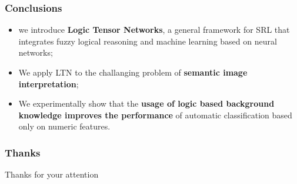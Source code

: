 \documentclass[xcolor=pdftex,dvipsnames,table]{beamer}
\begin{document}
\begin{frame}
  \frametitle{Conclusions}
  \begin{itemize}
  \item we introduce \textbf{Logic Tensor Networks},
    a general framework for SRL that integrates
      fuzzy logical reasoning and machine learning based on neural networks;
    \item We apply LTN to the challanging problem of \textbf{semantic image
      interpretation};
  \item We experimentally show that the \textbf{usage of
      logic based background knowledge
      improves the performance} of automatic classification based
      only on numeric features.
  \end{itemize}
\end{frame}
\begin{frame}
  \frametitle{Thanks}
  \begin{center}
    \Huge Thanks for your attention 
\end{center}
\end{frame}
\end{document}

